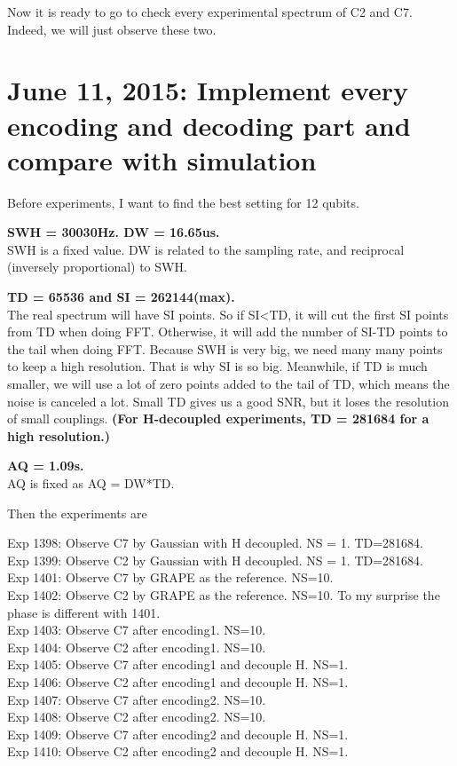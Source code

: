 \documentclass[prl,onecolumn]{revtex4-1}
\begin{document}
Now it is ready to go to check every experimental spectrum of C2 and C7. Indeed, we will just observe these two.

\clearpage
\section{June 11, 2015: Implement every encoding and decoding part and compare with simulation}

Before experiments, I want to find the best setting for 12 qubits.

\textbf{SWH = 30030Hz. DW = 16.65us. }\\
SWH is a fixed value. DW is related to the sampling rate, and reciprocal (inversely proportional) to SWH.

\textbf{TD = 65536 and SI = 262144(max).} \\
The real spectrum will have SI points. So if SI<TD, it will cut the first SI points from TD when doing FFT. Otherwise, it will add the number of SI-TD points to the tail when doing FFT. Because SWH is very big, we need many many points to keep a high resolution. That is why SI is so big. Meanwhile, if TD is much smaller, we will use a lot of zero points added to the tail of TD, which means the noise is canceled a lot. Small TD gives us a good SNR, but it loses the resolution of small couplings.
\textbf{(For H-decoupled experiments, TD = 281684 for a high resolution.)}

\textbf{AQ = 1.09s.}\\
AQ is fixed as AQ = DW*TD.

Then the experiments are

Exp 1398: Observe C7 by Gaussian with H decoupled. NS = 1. TD=281684. \\
Exp 1399: Observe C2 by Gaussian with H decoupled. NS = 1. TD=281684. \\
Exp 1401: Observe C7 by GRAPE as the reference. NS=10.\\
Exp 1402: Observe C2 by GRAPE as the reference. NS=10. To my surprise the phase is different with 1401.\\
Exp 1403: Observe C7 after encoding1. NS=10.\\
Exp 1404: Observe C2 after encoding1. NS=10.\\
Exp 1405: Observe C7 after encoding1 and decouple H. NS=1.\\
Exp 1406: Observe C2 after encoding1 and decouple H. NS=1.\\
Exp 1407: Observe C7 after encoding2. NS=10.\\
Exp 1408: Observe C2 after encoding2. NS=10.\\
Exp 1409: Observe C7 after encoding2 and decouple H. NS=1.\\
Exp 1410: Observe C2 after encoding2 and decouple H. NS=1.\\
\end{document}
